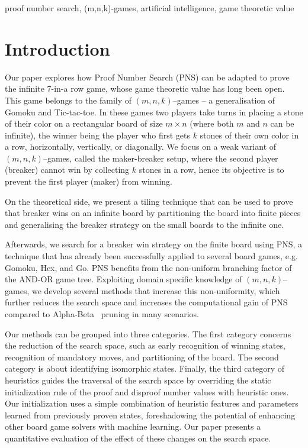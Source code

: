 \documentclass[conference]{IEEEtran}
\theoremstyle{definition}
\begin{document}
\begin{IEEEkeywords}
proof number search, (m,n,k)-games, artificial intelligence, game theoretic value
\end{IEEEkeywords}

\section{Introduction}
\label{sec:introduction}

Our paper explores how Proof Number Search (PNS) can be adapted to prove the infinite 7-in-a row game, whose game theoretic value has long been open. This game belongs to the family of $(m,n,k)$--games -- a generalisation of Gomoku and Tic-tac-toe. In these games two players take turns in placing a stone of their color on a rectangular board of size $m \times n$ (where both $m$ and $n$ can be
infinite), the winner being the player who first gets $k$ stones of
their own color in a row, horizontally, vertically, or
diagonally. We focus on a weak variant of $(m,n,k)$--games, called the maker-breaker setup, where the second player (breaker) cannot win by collecting $k$ stones in a row, hence its objective is to prevent the first player (maker) from winning.

On the theoretical side, we present a tiling technique that can be used to prove that breaker wins on an infinite board by partitioning the board into finite pieces and generalising the breaker strategy on the small boards to the infinite one.

Afterwards, we search for a breaker win strategy on the finite board using PNS, a technique that has already been successfully applied to several board games, e.g. Gomoku, Hex, and Go. PNS benefits from the non-uniform branching factor of the AND-OR game tree. Exploiting domain specific knowledge of $(m,n,k)$--games, we develop several methods that increase this non-uniformity, which further reduces the search space and increases the computational gain of PNS compared to Alpha-Beta~\cite{Bundy1984} pruning in many scenarios. 

Our methods can be grouped into three categories. The first category concerns the reduction of the search space, such as early recognition of winning states, recognition of mandatory moves,  and partitioning of the board. The second category is about identifying isomorphic states. Finally, the third category of heuristics guides the traversal of the search space by overriding the static initialization rule of the proof and disproof number values with heuristic ones. Our initialization uses a simple combination of heuristic features and parameters learned from previously proven states, foreshadowing the potential of enhancing other board game solvers with machine learning. Our paper presents a quantitative evaluation of the effect of these changes on the search space.
\end{document}
